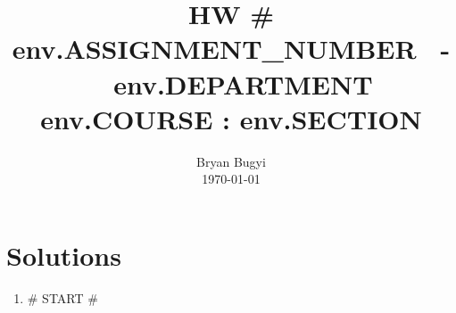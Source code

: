 \documentclass[12pt]{article}
\title{HW \#{{ env.ASSIGNMENT_NUMBER }}~-~{{ env.DEPARTMENT }} {{ env.COURSE }}:{{ env.SECTION }}\vspace{-0.5cm}}
\author{Bryan Bugyi\\\today}
\date{}
\begin{document}
\maketitle
\section*{Solutions}
\begin{enumerate}
   \item
{# START #}
\end{enumerate}
\end{document}
